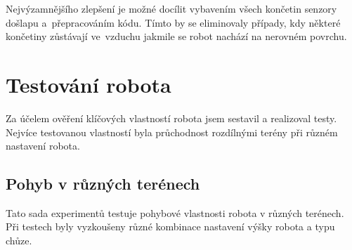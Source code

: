 Nejvýzamnějšího zlepšení je možné docílit vybavením všech končetin senzory došlapu a~přepracováním kódu. Tímto by se eliminovaly případy, kdy některé končetiny zůstávají ve~vzduchu jakmile se robot nachází na nerovném povrchu.

\section{Testování robota}
\label{tests}
Za účelem ověření klíčových vlastností robota jsem sestavil a realizoval testy. Nejvíce testovanou vlastností byla průchodnost rozdílnými terény při různém nastavení robota.

\subsection*{Pohyb v různých terénech}
Tato sada experimentů testuje pohybové vlastnosti robota v různých terénech. Při testech byly vyzkoušeny různé kombinace nastavení výšky robota a typu chůze.

